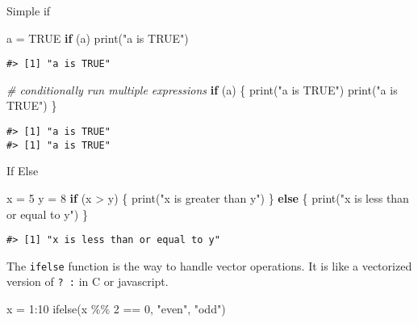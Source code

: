 \documentclass[
]{book}
\newenvironment{Shaded}{\begin{snugshade}}{\end{snugshade}}
\newcommand{\CommentTok}[1]{\textcolor[rgb]{0.56,0.35,0.01}{\textit{#1}}}
\newcommand{\ConstantTok}[1]{\textcolor[rgb]{0.00,0.00,0.00}{#1}}
\newcommand{\ControlFlowTok}[1]{\textcolor[rgb]{0.13,0.29,0.53}{\textbf{#1}}}
\newcommand{\DecValTok}[1]{\textcolor[rgb]{0.00,0.00,0.81}{#1}}
\newcommand{\FunctionTok}[1]{\textcolor[rgb]{0.00,0.00,0.00}{#1}}
\newcommand{\NormalTok}[1]{#1}
\newcommand{\OtherTok}[1]{\textcolor[rgb]{0.56,0.35,0.01}{#1}}
\newcommand{\SpecialCharTok}[1]{\textcolor[rgb]{0.00,0.00,0.00}{#1}}
\newcommand{\StringTok}[1]{\textcolor[rgb]{0.31,0.60,0.02}{#1}}
\begin{document}
Simple if

\begin{Shaded}
\begin{Highlighting}[]
\NormalTok{a }\OtherTok{=} \ConstantTok{TRUE}
\ControlFlowTok{if}\NormalTok{ (a)  }
  \FunctionTok{print}\NormalTok{(}\StringTok{"a is TRUE"}\NormalTok{)}
\end{Highlighting}
\end{Shaded}

\begin{verbatim}
#> [1] "a is TRUE"
\end{verbatim}

\begin{Shaded}
\begin{Highlighting}[]
\CommentTok{\# conditionally run multiple expressions}
\ControlFlowTok{if}\NormalTok{ (a) \{}
  \FunctionTok{print}\NormalTok{(}\StringTok{"a is TRUE"}\NormalTok{)}
  \FunctionTok{print}\NormalTok{(}\StringTok{"a is TRUE"}\NormalTok{)}
\NormalTok{\}}
\end{Highlighting}
\end{Shaded}

\begin{verbatim}
#> [1] "a is TRUE"
#> [1] "a is TRUE"
\end{verbatim}

If Else

\begin{Shaded}
\begin{Highlighting}[]
\NormalTok{x }\OtherTok{=} \DecValTok{5}
\NormalTok{y }\OtherTok{=} \DecValTok{8}
\ControlFlowTok{if}\NormalTok{ (x }\SpecialCharTok{\textgreater{}}\NormalTok{ y) \{}
  \FunctionTok{print}\NormalTok{(}\StringTok{"x is greater than y"}\NormalTok{)}
\NormalTok{\} }\ControlFlowTok{else}\NormalTok{ \{}
  \FunctionTok{print}\NormalTok{(}\StringTok{"x is less than or equal to y"}\NormalTok{)}
\NormalTok{\}}
\end{Highlighting}
\end{Shaded}

\begin{verbatim}
#> [1] "x is less than or equal to y"
\end{verbatim}

The \texttt{ifelse} function is the way to handle vector operations. It is like a vectorized version of \texttt{?\ :} in C or javascript.

\begin{Shaded}
\begin{Highlighting}[]
\NormalTok{x }\OtherTok{=} \DecValTok{1}\SpecialCharTok{:}\DecValTok{10}
\FunctionTok{ifelse}\NormalTok{(x }\SpecialCharTok{\%\%} \DecValTok{2} \SpecialCharTok{==} \DecValTok{0}\NormalTok{, }\StringTok{"even"}\NormalTok{, }\StringTok{"odd"}\NormalTok{)}
\end{Highlighting}
\end{Shaded}
\end{document}
